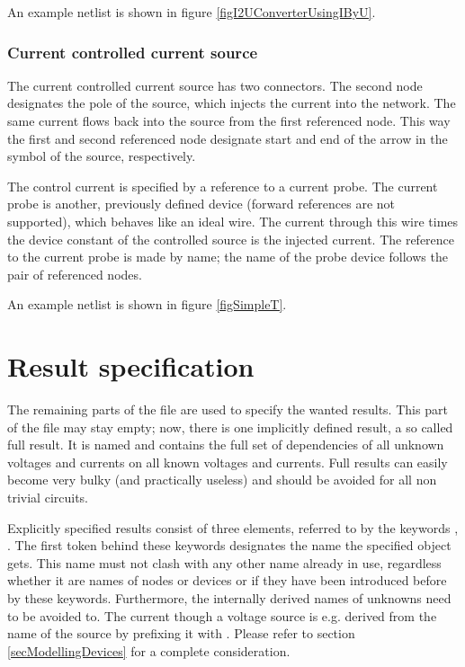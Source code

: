 An example netlist is shown in figure \ref{figI2UConverterUsingIByU}.


\subsubsection{Current controlled current source }

The current controlled current source  has two connectors. The
second node designates the pole of the source, which injects the current
into the network. The same current flows back into the source from the
first referenced node. This way the first and second referenced node
designate start and end of the arrow in the symbol of the source,
respectively.

The control current is specified by a reference to a current probe. The
current probe is another, previously defined device (forward references
are not supported), which behaves like an ideal wire. The current through
this wire times the device constant of the controlled source is the
injected current. The reference to the current probe is made by name; the
name of the probe device follows the pair of referenced nodes.

An example netlist is shown in figure \ref{figSimpleT}.


\section{Result specification}
\label{secResultSpec}

The remaining parts of the file are used to specify the wanted results.
This part of the file may stay empty; now, there is one implicitly defined
result, a so called full result. It is named  and
contains the full set of dependencies of all unknown voltages and currents
on all known voltages and currents. Full results can easily become very
bulky (and practically useless) and should be avoided for all non trivial
circuits.


Explicitly specified results consist of three elements, referred to by the
keywords ,  . The first token behind these
keywords designates the name the specified object gets. This name must not
clash with any other name already in use, regardless whether it are names
of nodes or devices or if they have been introduced before by these
keywords. Furthermore, the internally derived names of unknowns need to be
avoided to. The current though a voltage source is e.g. derived from the
name of the source by prefixing it with . Please refer to section
\ref{secModellingDevices} for a complete consideration.


